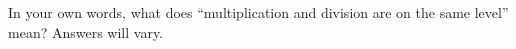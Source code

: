 {In your own words, what does ``multiplication and division are on the same level'' mean?}
{Answers will vary.}
